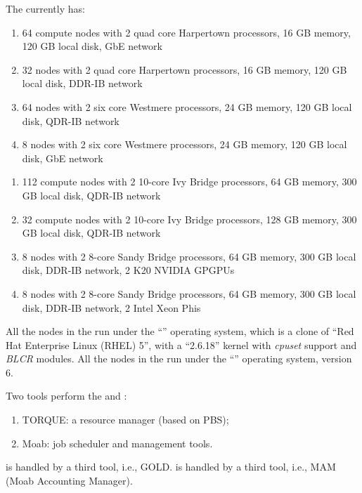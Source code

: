 The \hpc currently has:
\ifantwerpen
\begin{enumerate}
  \item  64 compute nodes with 2 quad core Harpertown processors, 16 GB memory,
         120 GB local disk, GbE network
  \item  32 nodes with 2 quad core Harpertown processors, 16 GB memory,
         120 GB local disk, DDR-IB network
  \item  64 nodes with 2 six core Westmere processors, 24 GB memory,
         120 GB local disk, QDR-IB network
  \item  8 nodes with 2 six core Westmere processors, 24 GB memory,
         120 GB local disk, GbE network
\end{enumerate}
\fi
\ifleuven
    \begin{enumerate}
      \item  112 compute nodes with 2 10-core Ivy Bridge processors, 64 GB memory,
             300 GB local disk, QDR-IB network
      \item  32 compute nodes with 2 10-core Ivy Bridge processors, 128 GB memory,
             300 GB local disk, QDR-IB network
      \item  8 nodes with 2 8-core Sandy Bridge processors, 64 GB memory,
             300 GB local disk, DDR-IB network, 2 K20 NVIDIA GPGPUs
      \item  8 nodes with 2 8-core Sandy Bridge processors, 64 GB memory,
             300 GB local disk, DDR-IB network, 2 Intel Xeon Phis
    \end{enumerate}
\fi

\ifantwerpen
All the nodes in the \hpc run under the ``\operatingsystem'' operating
system, which is a clone of ``Red Hat Enterprise Linux (RHEL) 5'', with a
``2.6.18'' kernel with \emph{cpuset} support and \emph{BLCR} modules.
\fi
\ifleuven
All the nodes in the \hpc run under the ``\operatingsystem'' operating system, version 6.
\fi

Two tools perform the  and :
\begin{enumerate}
  \item  TORQUE: a resource manager (based on PBS);
  \item  Moab: job scheduler and management tools.
\end{enumerate}
\ifantwerpen
{} is handled by a third tool, i.e., GOLD.
\fi
\ifleuven
{} is handled by a third tool, i.e., MAM (Moab Accounting Manager).
\fi

